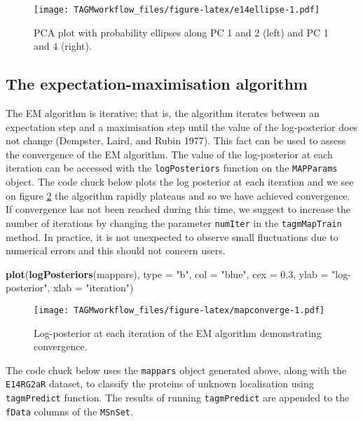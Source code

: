 \documentclass[]{article}
\newenvironment{Shaded}{\begin{snugshade}}{\end{snugshade}}
\newcommand{\KeywordTok}[1]{\textcolor[rgb]{0.13,0.29,0.53}{\textbf{{#1}}}}
\newcommand{\DataTypeTok}[1]{\textcolor[rgb]{0.13,0.29,0.53}{{#1}}}
\newcommand{\FloatTok}[1]{\textcolor[rgb]{0.00,0.00,0.81}{{#1}}}
\newcommand{\StringTok}[1]{\textcolor[rgb]{0.31,0.60,0.02}{{#1}}}
\newcommand{\NormalTok}[1]{{#1}}
\begin{document}
\begin{figure}[htbp]
\centering
\texttt{[image: TAGMworkflow\_files/figure-latex/e14ellipse-1.pdf]}
\caption{\label{fig:e14ellipse}PCA plot with probability ellipses along PC 1
and 2 (left) and PC 1 and 4 (right).}
\end{figure}

\subsection{The expectation-maximisation
algorithm}\label{the-expectation-maximisation-algorithm}

The EM algorithm is iterative; that is, the algorithm iterates between
an expectation step and a maximisation step until the value of the
log-posterior does not change (Dempster, Laird, and Rubin 1977). This
fact can be used to assess the convergence of the EM algorithm. The
value of the log-posterior at each iteration can be accessed with the
\texttt{logPosteriors} function on the \texttt{MAPParams} object. The
code chuck below plots the log posterior at each iteration and we see on
figure \ref{fig:mapconverge} the algorithm rapidly plateaus and so we
have achieved convergence. If convergence has not been reached during
this time, we suggest to increase the number of iterations by changing
the parameter \texttt{numIter} in the \texttt{tagmMapTrain} method. In
practice, it is not unexpected to observe small fluctuations due to
numerical errors and this should not concern users.

\begin{Shaded}
\begin{Highlighting}[]
\KeywordTok{plot}\NormalTok{(}\KeywordTok{logPosteriors}\NormalTok{(mappars), }\DataTypeTok{type =} \StringTok{"b"}\NormalTok{, }\DataTypeTok{col =} \StringTok{"blue"}\NormalTok{,}
     \DataTypeTok{cex =} \FloatTok{0.3}\NormalTok{, }\DataTypeTok{ylab =} \StringTok{"log-posterior"}\NormalTok{, }\DataTypeTok{xlab =} \StringTok{"iteration"}\NormalTok{)}
\end{Highlighting}
\end{Shaded}

\begin{figure}[htbp]
\centering
\texttt{[image: TAGMworkflow\_files/figure-latex/mapconverge-1.pdf]}
\caption{\label{fig:mapconverge}Log-posterior at each iteration of the EM
algorithm demonstrating convergence.}
\end{figure}

The code chuck below uses the \texttt{mappars} object generated above,
along with the \texttt{E14RG2aR} dataset, to classify the proteins of
unknown localisation using \texttt{tagmPredict} function. The results of
running \texttt{tagmPredict} are appended to the \texttt{fData} columns
of the \texttt{MSnSet}.
\end{document}
